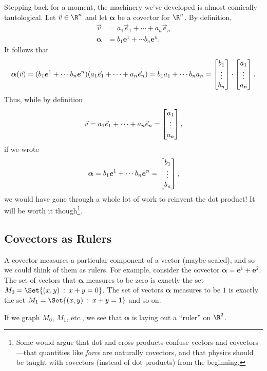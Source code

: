 Stepping back for a moment, the machinery we've developed is almost comically
tautological.  Let $\vec v\in \R^n$ and let $\bm \alpha$ be a covector for $\R^n$.  By 
definition,
\begin{align*}
	\vec v &= a_1\vec e_1+\cdots +a_n\vec e_n\\
	\bm \alpha &= b_1\bm e^1+\cdots b_n\bm e^n.
\end{align*}
It follows that
\[
	\bm \alpha(\vec v) = 
	(b_1\bm e^1+\cdots b_n\bm e^n)(a_1\vec e_1+\cdots +a_n\vec e_n)
	=b_1a_1+\cdots b_na_n = \begin{bmatrix}b_1\\\vdots\\b_n\end{bmatrix}\cdot \begin{bmatrix}a_1\\\vdots\\
	a_n\end{bmatrix}.
\]
Thus, while by definition 
\[
\vec v=a_1\vec e_1+\cdots +a_n\vec e_n=
\begin{bmatrix}a_1\\\vdots\\a_n\end{bmatrix},\]
if we  wrote
\[
	\bm \alpha =b_1\bm e^1+\cdots b_n\bm e^n=
\begin{bmatrix}b_1\\\vdots\\b_n\end{bmatrix},\]
we would have gone through
a whole lot of work to reinvent the dot product!  It will be worth it 
though\footnote{ Some would argue that dot and cross products confuse
vectors and covectors---that quantities like \emph{force}
are naturally covectors, and that physics should be taught
with covectors (instead of dot products) from the beginning.}.


\subsection{Covectors as Rulers}

A covector measures a particular component of a vector (maybe scaled), and
so we could think of them as rulers.  For example, consider the covector
$\bm\alpha = \bm e^1+\bm e^2$.  The set of vectors that $\bm\alpha$ measures
to be zero is exactly the set $M_0=\Set{(x,y)\given x+y=0}$.  The set of vectors
$\bm\alpha$ measures to be $1$ is exactly the set $M_1=\Set{(x,y)\given x+y=1}$ and so on.

If we graph $M_0$, $M_1$, etc., we see that $\bm\alpha$ is laying out a ``ruler'' on $\R^2$.

